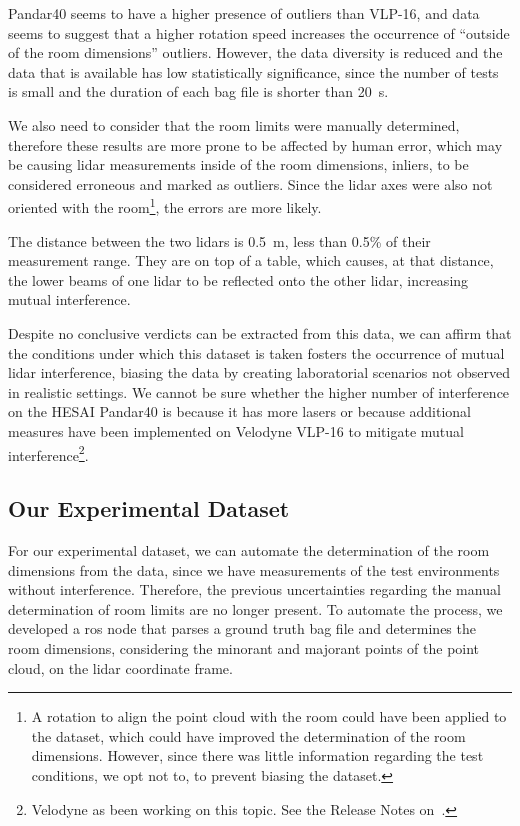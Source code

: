Pandar40 seems to have a higher presence of outliers than VLP-16, and data seems to suggest that a higher rotation speed increases the occurrence of ``outside of the room dimensions'' outliers. However, the data diversity is reduced and the data that is available has low statistically significance, since the number of tests is small and the duration of each bag file is shorter than \SI{20}{\second}.

We also need to consider that the room limits were manually determined, therefore these results are more prone to be affected by human error, which may be causing \ac{lidar} measurements inside of the room dimensions, inliers, to be considered erroneous and marked as outliers. Since the \ac{lidar} axes were also not oriented with the room\footnote{A rotation to align the point cloud with the room could have been applied to the dataset, which could have improved the determination of the room dimensions. However, since there was little information regarding the test conditions, we opt not to, to prevent biasing the dataset.}, the errors are more likely. 

The distance between the two \acp{lidar} is \SI{0.5}{\meter}, less than 0.5\% of their measurement range. They are on top of a table, which causes, at that distance, the lower beams of one \ac{lidar} to be reflected onto the other \ac{lidar}, increasing mutual interference.

Despite no conclusive verdicts can be extracted from this data, we can affirm that the conditions under which this dataset is taken fosters the occurrence of mutual \ac{lidar} interference, biasing the data by creating laboratorial scenarios not observed in realistic settings. We cannot be sure whether the higher number of interference on the HESAI Pandar40 is because it has more lasers or because additional measures have been implemented on Velodyne VLP-16 to mitigate mutual interference\footnote{Velodyne as been working on this topic. See the Release Notes on~\cite{vlp16}.}. 

\subsection{Our Experimental Dataset}
\label{subsec:lidar-interference:room-outliers-experimental-setup}
For our experimental dataset, we can automate the determination of the room dimensions from the data, since we have measurements of the test environments without interference. Therefore, the previous uncertainties regarding the manual determination of room limits are no longer present. To automate the process, we developed a \ac{ros} node that parses a ground truth bag file and determines the room dimensions, considering the minorant and majorant points of the point cloud, on the \ac{lidar} coordinate frame. 

